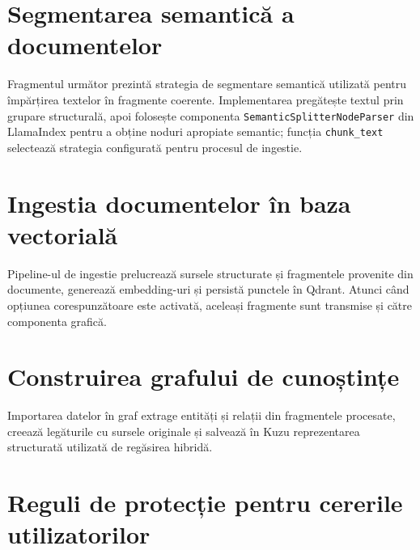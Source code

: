 \documentclass[12pt, a4paper, oneside, romanian]{teza-upb}
\begin{document}
\label{anexa:retrieval-dispatch}


\section{Segmentarea semantică a documentelor}

Fragmentul următor prezintă strategia de segmentare semantică utilizată pentru împărțirea textelor în fragmente coerente. Implementarea pregătește textul prin grupare structurală, apoi folosește componenta \texttt{SemanticSplitterNodeParser} din LlamaIndex pentru a obține noduri apropiate semantic; funcția \texttt{chunk\_text} selectează strategia configurată pentru procesul de ingestie.

\label{anexa:semantic-chunking}


\section{Ingestia documentelor în baza vectorială}

Pipeline-ul de ingestie prelucrează sursele structurate și fragmentele provenite din documente, generează embedding-uri și persistă punctele în Qdrant. Atunci când opțiunea corespunzătoare este activată, aceleași fragmente sunt transmise și către componenta grafică.

\label{anexa:qdrant-ingestion-pipeline}


\section{Construirea grafului de cunoștințe}

Importarea datelor în graf extrage entități și relații din fragmentele procesate, creează legăturile cu sursele originale și salvează în Kuzu reprezentarea structurată utilizată de regăsirea hibridă.

\label{anexa:graph-ingestion}


\section{Reguli de protecție pentru cererile utilizatorilor}
\end{document}
